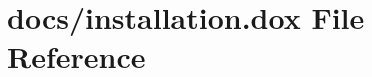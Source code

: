 \hypertarget{installation_8dox}{}\section{docs/installation.dox File Reference}
\label{installation_8dox}
